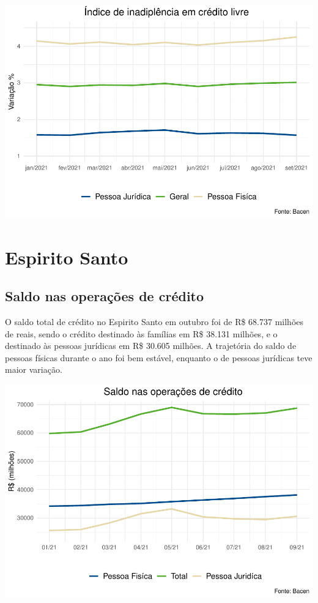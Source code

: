 \documentclass[100,a4paperpaper,]{article}
\begin{document}
\includegraphics{credito_files/figure-latex/inadimplencia br-1.pdf}

\newpage
\section{Espirito Santo}
\subsection {Saldo nas operações de crédito }
\vspace{0,20cm}

O saldo total de crédito no Espirito Santo em outubro foi de R\$ 68.737
milhões de reais, sendo o crédito destinado às famílias em R\$ 38.131
milhões, e o destinado às pessoas jurídicas em R\$ 30.605 milhões. A
trajetória do saldo de pessoas físicas durante o ano foi bem estável,
enquanto o de pessoas jurídicas teve maior variação.

\includegraphics{credito_files/figure-latex/credito es-1.pdf}
\end{document}
